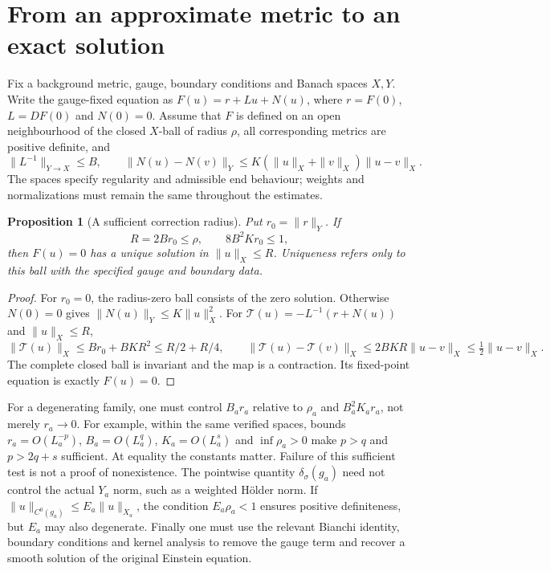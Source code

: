 \documentclass[a4paper,11pt]{article}
\numberwithin{equation}{section}
\newtheorem{proposition}[theorem]{Proposition}
\theoremstyle{definition}
\begin{document}
\section{From an approximate metric to an exact solution}\label{sec:construction-repair}
Fix a background metric, gauge, boundary conditions and Banach spaces
$X,Y$. Write the gauge-fixed equation as
$F(u)=r+Lu+N(u)$, where $r=F(0)$, $L=DF(0)$ and $N(0)=0$.
Assume that $F$ is defined on an open neighbourhood of the closed
$X$-ball of radius $\rho$, all corresponding metrics are positive definite,
and
\[
\|L^{-1}\|_{Y\to X}\le B,\qquad
\|N(u)-N(v)\|_Y\le
K(\|u\|_X+\|v\|_X)\|u-v\|_X.
\]
The spaces specify regularity and admissible end behaviour; weights and
normalizations must remain the same throughout the estimates.

\begin{proposition}[A sufficient correction radius]\label{prop:construction-repair}
Put $r_0=\|r\|_Y$. If
\begin{equation}\label{eq:construction-repair-radius}
R=2Br_0\le\rho,\qquad 8B^2Kr_0\le1,
\end{equation}
then $F(u)=0$ has a unique solution in $\|u\|_X\le R$.
Uniqueness refers only to this ball with the specified gauge and boundary data.
\end{proposition}
\begin{proof}
For $r_0=0$, the radius-zero ball consists of the zero solution.
Otherwise $N(0)=0$ gives $\|N(u)\|_Y\le K\|u\|_X^2$.
For $\mathcal T(u)=-L^{-1}(r+N(u))$ and $\|u\|_X\le R$,
\[
\|\mathcal T(u)\|_X\le Br_0+BKR^2
\le R/2+R/4,\qquad
\|\mathcal T(u)-\mathcal T(v)\|_X
\le2BKR\|u-v\|_X\le\tfrac12\|u-v\|_X.
\]
The complete closed ball is invariant and the map is a contraction.
Its fixed-point equation is exactly $F(u)=0$.
\end{proof}

For a degenerating family, one must control $B_ar_a$ relative to $\rho_a$
and $B_a^2K_ar_a$, not merely $r_a\to0$.
For example, within the same verified spaces, bounds
$r_a=O(L_a^{-p})$, $B_a=O(L_a^q)$, $K_a=O(L_a^s)$ and
$\inf\rho_a>0$ make $p>q$ and $p>2q+s$ sufficient.
At equality the constants matter. Failure of this sufficient test is not
a proof of nonexistence.
The pointwise quantity $\delta_\sigma(g_a)$ need not control the actual
$Y_a$ norm, such as a weighted H\"older norm.
If $\|u\|_{C^0(g_a)}\le E_a\|u\|_{X_a}$, the condition
$E_a\rho_a<1$ ensures positive definiteness, but $E_a$ may also degenerate.
Finally one must use the relevant Bianchi identity, boundary conditions and
kernel analysis to remove the gauge term and recover a smooth solution of
the original Einstein equation.
\end{document}
